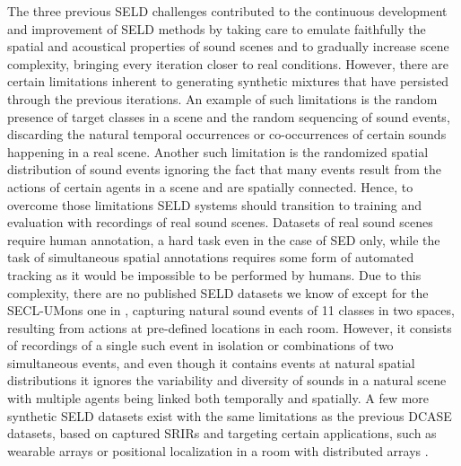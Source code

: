 \documentclass{article}
\begin{document}
\begin{sloppy}
The three previous SELD challenges contributed to the continuous development and improvement of SELD methods by taking care to emulate faithfully the spatial and acoustical properties of sound scenes and to gradually increase scene complexity, bringing every iteration closer to real conditions. However, there are certain limitations inherent to generating synthetic mixtures that have persisted through the previous iterations. An example of such limitations is the random presence of target classes in a scene and the random sequencing of sound events, discarding the natural temporal occurrences or co-occurrences of certain sounds happening in a real scene. Another such limitation is the randomized spatial distribution of sound events ignoring the fact that many events result from the actions of certain agents in a scene and are spatially connected. Hence, to overcome those limitations SELD systems should transition to training and evaluation with recordings of real sound scenes. Datasets of real sound scenes require human annotation, a hard task even in the case of SED only, while the task of simultaneous spatial annotations requires some form of automated tracking as it would be impossible to be performed by humans. Due to this complexity, there are no published SELD datasets we know of except for the SECL-UMons one in \cite{brousmiche2020secl}, capturing natural sound events of 11 classes in two spaces, resulting from actions at pre-defined locations in each room. However, it consists of recordings of a single such event in isolation or combinations of two simultaneous events, and even though it contains events at natural spatial distributions it ignores the variability and diversity of sounds in a natural scene with multiple agents being linked both temporally and spatially. A few more synthetic SELD datasets exist with the same limitations as the previous DCASE datasets, based on captured SRIRs and targeting certain applications, such as wearable arrays \cite{nagatomo2022wearable} or positional localization in a room with distributed arrays \cite{guizzo2021l3das21}.


\end{sloppy}
\end{document}
